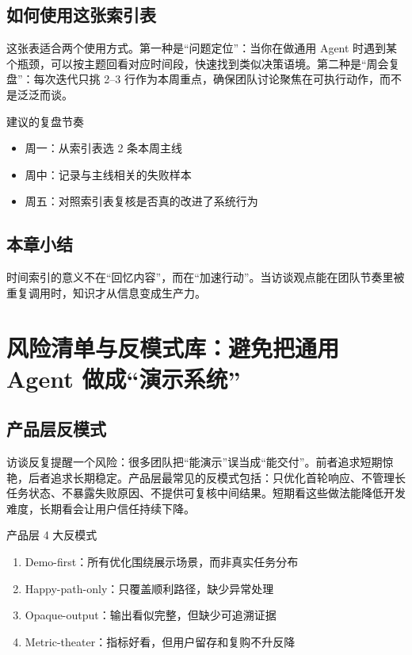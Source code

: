 \documentclass[a4paper]{article}
\begin{document}
\subsection{如何使用这张索引表}

这张表适合两个使用方式。第一种是“问题定位”：当你在做通用 Agent 时遇到某个瓶颈，可以按主题回看对应时间段，快速找到类似决策语境。第二种是“周会复盘”：每次迭代只挑 2--3 行作为本周重点，确保团队讨论聚焦在可执行动作，而不是泛泛而谈。

\begin{importantbox}{建议的复盘节奏}
\begin{itemize}
    \item 周一：从索引表选 2 条本周主线
    \item 周中：记录与主线相关的失败样本
    \item 周五：对照索引表复核是否真的改进了系统行为
\end{itemize}
\end{importantbox}

\subsection{本章小结}

时间索引的意义不在“回忆内容”，而在“加速行动”。当访谈观点能在团队节奏里被重复调用时，知识才从信息变成生产力。


\section{风险清单与反模式库：避免把通用 Agent 做成“演示系统”}

\subsection{产品层反模式}

访谈反复提醒一个风险：很多团队把“能演示”误当成“能交付”。前者追求短期惊艳，后者追求长期稳定。产品层最常见的反模式包括：只优化首轮响应、不管理长任务状态、不暴露失败原因、不提供可复核中间结果。短期看这些做法能降低开发难度，长期看会让用户信任持续下降。

\begin{warningbox}{产品层 4 大反模式}
\begin{enumerate}
    \item Demo-first：所有优化围绕展示场景，而非真实任务分布
    \item Happy-path-only：只覆盖顺利路径，缺少异常处理
    \item Opaque-output：输出看似完整，但缺少可追溯证据
    \item Metric-theater：指标好看，但用户留存和复购不升反降
\end{enumerate}
\end{warningbox}
\end{document}
